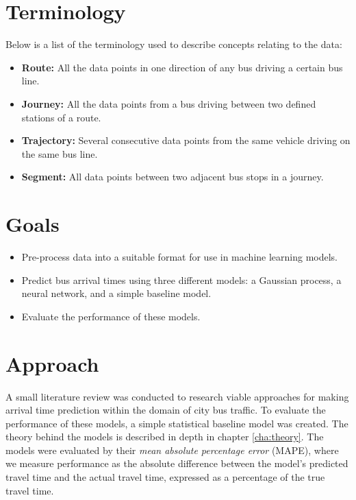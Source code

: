 \section{Terminology}
\label{sec:terminology}
Below is a list of the terminology used to describe concepts relating to the data:
\begin{itemize}
\item \textbf{Route:} All the data points in one direction of any bus driving a certain bus line.
\item \textbf{Journey:} All the data points from a bus driving between two defined stations of a route.
\item \textbf{Trajectory:} Several consecutive data points from the same vehicle driving on the same bus line.
\item \textbf{Segment:} All data points between two adjacent bus stops in a journey.
\\
\end{itemize}

\section{Goals}
\label{sec:aim}

\begin{itemize}[]
  \item Pre-process data into a suitable format for use in machine learning models.
  \item Predict bus arrival times using three different models: a Gaussian process, a neural network, and a simple baseline model.
  \item Evaluate the performance of these models.
\end{itemize}

\section{Approach}
\label{sec:research-questions}

A small literature review was conducted to research viable approaches for making arrival time prediction within the domain of city bus traffic. To evaluate the performance of these models, a simple statistical baseline model was created. The theory behind the models is described in depth in chapter \ref{cha:theory}. The models were evaluated by their \textit{mean absolute percentage error} (MAPE), where we measure performance as the absolute difference between the model's predicted travel time and the actual travel time, expressed as a percentage of the true travel time. 


